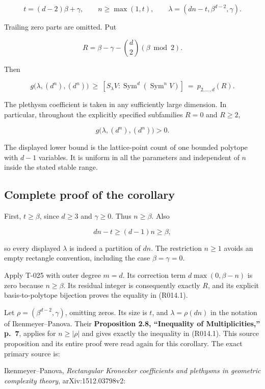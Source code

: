 \documentclass[
  10pt,
]{article}
\begin{document}
\[
 t=(d-2)\beta+\gamma,\qquad
 n\ge\max(1,t),\qquad
 \lambda=(dn-t,\beta^{d-2},\gamma).
\]

Trailing zero parts are omitted. Put

\[
 R=\beta-\gamma-\binom d2(\beta\bmod2).
\]

Then

\[
 \boxed{\displaystyle
 g\bigl(\lambda,(d^n),(d^n)\bigr)
 \ \ge\
 [S_\lambda V:\operatorname{Sym}^d(\operatorname{Sym}^nV)]
 \ =\ p_{2,\ldots,d}(R).}
 \tag{R014.1}
\]

The plethysm coefficient is taken in any sufficiently large dimension.
In particular, throughout the explicitly specified subfamilies \(R=0\)
and \(R\ge2\),

\[
 g\bigl(\lambda,(d^n),(d^n)\bigr)>0.
 \tag{R014.2}
\]

The displayed lower bound is the lattice-point count of one bounded
polytope with \(d-1\) variables. It is uniform in all the parameters and
independent of \(n\) inside the stated stable range.

\subsection{Complete proof of the
corollary}\label{complete-proof-of-the-corollary}

First, \(t\ge\beta\), since \(d\ge3\) and \(\gamma\ge0\). Thus
\(n\ge\beta\). Also

\[
 dn-t\ge(d-1)n\ge\beta,
\]

so every displayed \(\lambda\) is indeed a partition of \(dn\). The
restriction \(n\ge1\) avoids an empty rectangle convention, including
the case \(\beta=\gamma=0\).

Apply T-025 with outer degree \(m=d\). Its correction term
\(d\max(0,\beta-n)\) is zero because \(n\ge\beta\). Its residual integer
is consequently exactly \(R\), and its explicit basis-to-polytope
bijection proves the equality in (R014.1).

Let \(\rho=(\beta^{d-2},\gamma)\), omitting zeros. Its size is \(t\),
and \(\lambda=\rho(dn)\) in the notation of Ikenmeyer--Panova. Their
\textbf{Proposition 2.8, ``Inequality of Multiplicities,'' p.~7},
applies for \(n\ge|\rho|\) and gives exactly the inequality in (R014.1).
This source proposition and its entire proof were read again for this
corollary. The exact primary source is:

Ikenmeyer--Panova, \emph{Rectangular Kronecker coefficients and
plethysms in geometric complexity theory}, arXiv:1512.03798v2:
\end{document}
